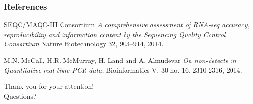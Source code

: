\documentclass{beamer}
\begin{document}
\begin{frame}
\frametitle{References}
\begin{footnotesize}
\begin{thebibliography}{X}

SEQC/MAQC-III Consortium \textit {A comprehensive assessment of RNA-seq accuracy, reproducibility and information content by the Sequencing Quality Control Consortium} Nature Biotechnology 32, 903–914, 2014.

M.N. McCall, H.R. McMurray, H. Land and A. Almudevar \textit {On non-detects in Quantitative real-time PCR data.} Bioinformatics V. 30 no. 16, 2310-2316, 2014.
\end{thebibliography}
\end{footnotesize}
\end{frame}

\begin{frame}
\begin{center}
\begin{Huge}
Thank you for your attention! \pause\\ Questions?
\end{Huge}
\end{center}
\end{frame}

\end{document}
